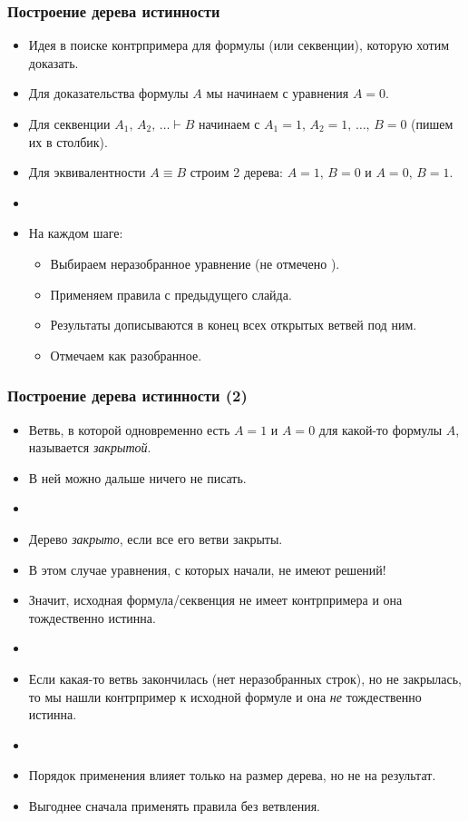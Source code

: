 \documentclass[10pt]{beamer}
\begin{document}
\begin{frame}
\frametitle{Построение дерева истинности}
\begin{itemize}
    \item Идея в поиске контрпримера для формулы (или секвенции), которую хотим доказать.
    \item Для доказательства формулы $A$ мы начинаем с уравнения $A=0$.
    \item Для секвенции $A_1,\, A_2,\,\ldots \vdash B$ начинаем с \pause $A_1=1,\, A_2=1,\, \ldots,\, B=0$ (пишем их в столбик).
    \item Для эквивалентности $A \equiv B$ строим 2 дерева: \pause $A=1,\, B=0$ и $A=0,\, B=1$.
    \pause
    \item[]
    \item На каждом шаге:
    \begin{itemize}
        \item Выбираем неразобранное уравнение (не отмечено \checkmark).
        \item Применяем правила с предыдущего слайда.
        \item Результаты дописываются в конец всех открытых ветвей под ним.
        \item Отмечаем как разобранное.
    \end{itemize}
\end{itemize}
\end{frame}

\begin{frame}
\frametitle{Построение дерева истинности (2)}
\begin{itemize}
    \item Ветвь, в которой одновременно есть $A=1$ и $A=0$ для какой-то формулы $A$, называется \emph{закрытой}.
    \item В ней можно дальше ничего не писать.
    \item[]
    \item Дерево \emph{закрыто}, если все его ветви закрыты. 
    \item В этом случае уравнения, с которых начали, не имеют решений! 
    \item Значит, исходная формула/секвенция не имеет контрпримера и она тождественно истинна.
    \item[]
    \pause
    \item Если какая-то ветвь закончилась (нет неразобранных строк), но не закрылась, то мы нашли контрпример к исходной формуле и она \emph{не} тождественно истинна.
    \item[]
    \pause
    \item Порядок применения влияет только на размер дерева, но не на результат.
    \item Выгоднее сначала применять правила без ветвления.
\end{itemize}
\end{frame}
\end{document}
